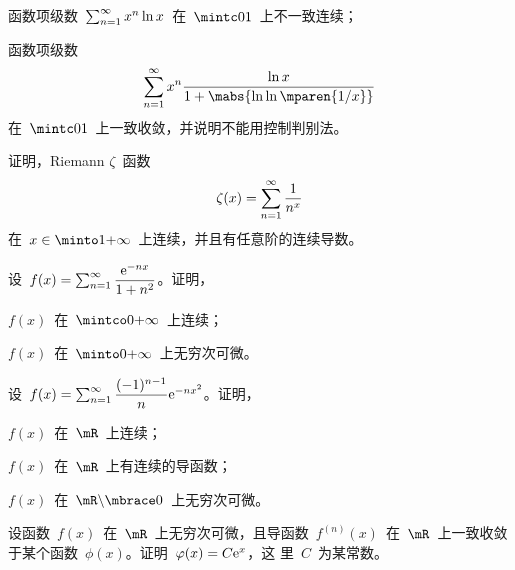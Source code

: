 \begin{exercise}
\begin{exlist}
  \item 函数项级数~$\sum_{n=1}^\infty x^n\ln x$~在~$\mintc01$~上不一致连续；
  \item 函数项级数
  \[
    \sum_{n=1}^\sinf x^n\dfrac{\ln x}{1+\mabs{\ln\ln\mparen{\sfrac1x}}}
  \]
  在~$\mintc 01$~上一致收敛，并说明不能用控制判别法。
\end{exlist}
\item 证明，Riemann $\zeta$~函数
\[
  \zeta(x)=\sum_{n=1}^\infty\frac1{n^x}
\]
在~$x\in\minto1\pinf$~上连续，并且有任意阶的连续导数。
\item 设~$f(x)=\sum_{n=1}^\infty\dfrac{\mathrm e^{-nx}}{1+n^2}$。证明，
\begin{exlistcols}
  \item $f(x)$~在~$\mintco0\pinf$~上连续；
  \item $f(x)$~在~$\minto0\pinf$~上无穷次可微。
\end{exlistcols}
\item 设~$f(x)=\sum_{n=1}^\infty\dfrac{(-1)^{n-1}}n\mathrm e^{-nx^2}$。证明，
\begin{exlistcols}
  \item $f(x)$~在~$\mR$~上连续；
  \item $f(x)$~在~$\mR$~上有连续的导函数；
  \item $f(x)$~在~$\mR\difset\mbrace 0$~上无穷次可微。
\end{exlistcols}
\item 设函数~$f(x)$~在~$\mR$~上无穷次可微，且导函数~$f^{(n)}(x)$~在~$\mR$~上一致收敛于某个函数~$\phi(x)$。证明~$\varphi(x)=C\mathrm e^x$，这
里~$C$~为某常数。
\end{exercise}

